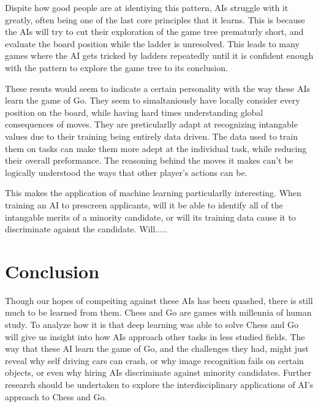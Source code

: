 \documentclass[12pt]{IEEEtran}
\begin{document}
\par Dispite how good people are at identiying this pattern, AIs struggle with it greatly, often being one of the last core principles that it learns. This is because the AIs will try to cut their exploration of the game tree prematurly short, and evaluate the board position while the ladder is unresolved. This leads to many games where the AI gets tricked by ladders repeatedly until it is confident enough with the pattern to explore the game tree to its conclusion. 





\par These resuts would seem to indicate a certain personality with the way these AIs learn the game of Go. They seem to simaltaniously have locally consider every position on the board, while having hard times understanding global consequences of moves. They are preticularlly adapt at recognizing intangable values due to their training being entirely data driven. The data used to train them on tasks can make them more adept at the individual task, while reducing their overall preformance. The reasoning behind the moves it makes can't be logically understood the ways that other player's actions can be. 

\par This makes the application of machine learning particularlly interesting. When training an AI to prescreen applicants, will it be able to identify all of the intangable merits of a minority candidate, or will its training data cause it to discriminate agaisnt the candidate. Will.....

\section{Conclusion}
Though our hopes of compeiting against these AIs has been quashed, there is still much to be learned from them. Chess and Go are games with millennia of human study. To analyze how it is that deep learning was able to solve Chess and Go will give us insight into how AIs approach other tasks in less studied fields. The way that these AI learn the game of Go, and the challenges they had, might just reveal why self driving cars can crash, or why image recognition fails on certain objects, or even why hiring AIs discriminate against minority candidates. Further research should be undertaken to explore the interdisciplinary applications of AI's approach to Chess and Go. 
\end{document}
